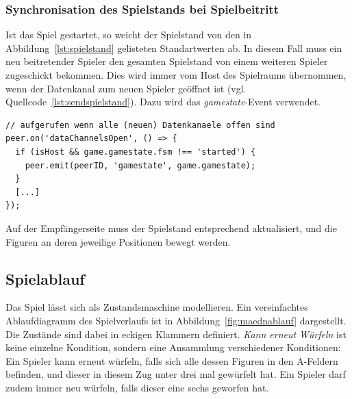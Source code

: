 \subsubsection{Synchronisation des Spielstands bei Spielbeitritt}
Ist das Spiel gestartet, so weicht der Spielstand von den in Abbildung~\ref{lst:spielstand} gelisteten Standartwerten ab. In diesem Fall muss ein neu beitretender Spieler den gesamten Spielstand von einem weiteren Spieler zugeschickt bekommen. Dies wird immer vom Host des Spielraums übernommen, wenn der Datenkanal zum neuen Spieler geöffnet ist (vgl. Quellcode~\ref{lst:sendspielstand}). Dazu wird das \textit{gamestate}-Event verwendet.

\vspace{5pt}
\lstset{language=js, style=STYLE_CODE_JS}
\begin{minipage}{\textwidth}
\begin{singlespace}
\begin{lstlisting}[caption={Senden des Spielstands -- game.js}, captionpos=b, label={lst:sendspielstand}]
// aufgerufen wenn alle (neuen) Datenkanaele offen sind
peer.on('dataChannelsOpen', () => {
  if (isHost && game.gamestate.fsm !== 'started') {
    peer.emit(peerID, 'gamestate', game.gamestate);
  }
  [...]
});
\end{lstlisting}
\end{singlespace}
\end{minipage}

Auf der Empfängerseite muss der Spielstand entsprechend aktualisiert, und die Figuren an deren jeweilige Positionen bewegt werden.

\subsection{Spielablauf}
Das Spiel lässt sich als Zustandsmaschine modellieren. Ein vereinfachtes Ablaufdiagramm des Spielverlaufs ist in Abbildung~\ref{fig:maednablauf} dargestellt. Die \glqq{}Zustände\grqq{} sind dabei in eckigen Klammern definiert. \textit{Kann erneut Würfeln} ist keine einzelne Kondition, sondern eine Ansammlung verschiedener Konditionen: Ein Spieler kann erneut würfeln, falls sich alle dessen Figuren in den A-Feldern befinden, und dieser in diesem Zug unter drei mal gewürfelt hat. Ein Spieler darf zudem immer neu würfeln, falls dieser eine sechs geworfen hat.

